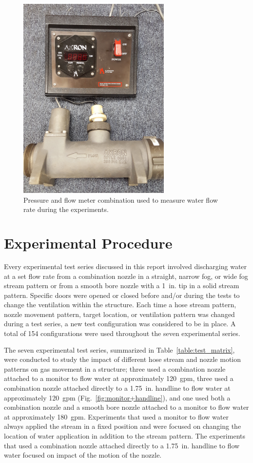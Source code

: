 \documentclass[12pt,oneside]{book}
\begin{document}
\begin{figure}[!ht]
	\includegraphics[width=3in]{../Figures/Pictures/flow_meter}
	\caption[Flow meter used to measure flow rate during experiments.]{Pressure and flow meter combination used to measure water flow rate during the experiments.}
	\label{fig:flow_meter}
\end{figure}
\FloatBarrier

\section{Experimental Procedure}
\label{sec:exp_procedure}
Every experimental test series discussed in this report involved discharging water at a set flow rate from a combination nozzle in a straight, narrow fog, or wide fog stream pattern or from a smooth bore nozzle with a 1~in. tip in a solid stream pattern. Specific doors were opened or closed before and/or during the tests to change the ventilation within the structure. Each time a hose stream pattern, nozzle movement pattern, target location, or ventilation pattern was changed during a test series, a new test configuration was considered to be in place. A total of 154 configurations were used throughout the seven experimental series. 

The seven experimental test series, summarized in Table~\ref{table:test_matrix}, were conducted to study the impact of different hose stream and nozzle motion patterns on gas movement in a structure; three used a combination nozzle attached to a monitor to flow water at approximately 120~gpm, three used a combination nozzle attached directly to a 1.75~in. handline to flow water at approximately 120~gpm (Fig.~\ref{fig:monitor+handline}), and one used both a combination nozzle and a smooth bore nozzle attached to a monitor to flow water at approximately 180~gpm. Experiments that used a monitor to flow water always applied the stream in a fixed position and were focused on changing the location of water application in addition to the stream pattern. The experiments that used a combination nozzle attached directly to a 1.75~in. handline to flow water focused on impact of the motion of the nozzle.
\end{document}
